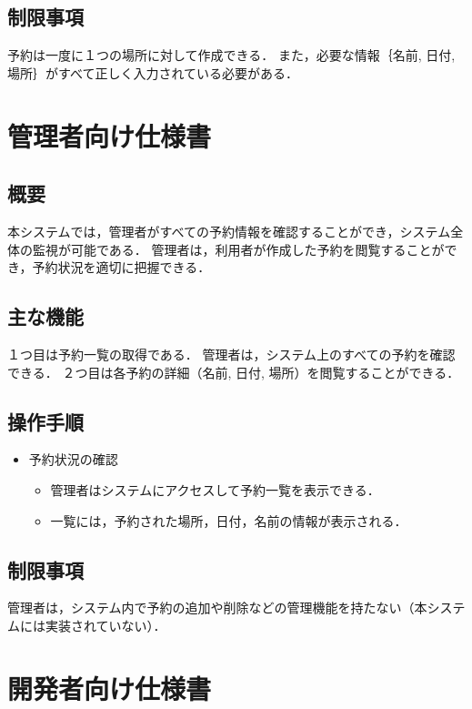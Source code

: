 \documentclass[uplatex,dvipdfmx]{jsarticle}
\begin{document}
\subsection{制限事項}
予約は一度に１つの場所に対して作成できる．
また，必要な情報｛名前, 日付, 場所｝がすべて正しく入力されている必要がある．



\section{管理者向け仕様書}

\subsection{概要}
本システムでは，管理者がすべての予約情報を確認することができ，システム全体の監視が可能である．
管理者は，利用者が作成した予約を閲覧することができ，予約状況を適切に把握できる．

\subsection{主な機能}
１つ目は予約一覧の取得である．
管理者は，システム上のすべての予約を確認できる．
２つ目は各予約の詳細（名前, 日付, 場所）を閲覧することができる．

\subsection{操作手順}

\begin{itemize}
    \item 予約状況の確認
    \begin{itemize}
        \item 管理者はシステムにアクセスして予約一覧を表示できる．
        \item 一覧には，予約された場所，日付，名前の情報が表示される．
    \end{itemize}
\end{itemize}

\subsection{制限事項}
管理者は，システム内で予約の追加や削除などの管理機能を持たない（本システムには実装されていない）．



\section{開発者向け仕様書}
\end{document}
